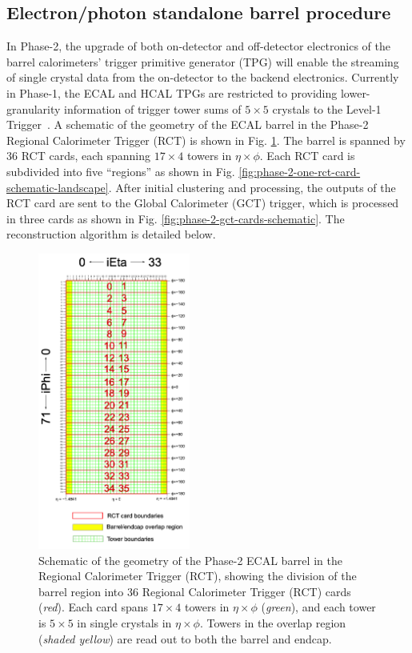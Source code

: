 \subsection{Electron/photon standalone barrel procedure}
In Phase-2, the upgrade of both on-detector and off-detector electronics of the barrel calorimeters' trigger primitive generator (TPG) will enable the streaming of single crystal data from the on-detector to the backend electronics. Currently in Phase-1, the ECAL and HCAL TPGs are restricted to providing lower-granularity information of trigger tower sums of $5 \times 5$ crystals to the Level-1 Trigger~\cite{CMS-TDR-021}. A schematic of the geometry of the ECAL barrel in the Phase-2 Regional Calorimeter Trigger (RCT) is shown in Fig. \ref{fig:phase-2-rct-cards-schematic}. The barrel is spanned by 36 RCT cards, each spanning $17 \times 4$ towers in $\eta \times \phi$. Each RCT card is subdivided into five ``regions'' as shown in Fig. \ref{fig:phase-2-one-rct-card-schematic-landscape}.  After initial clustering and processing, the outputs of the RCT card are sent to the Global Calorimeter (GCT) trigger, which is processed in three cards as shown in Fig. \ref{fig:phase-2-gct-cards-schematic}. The reconstruction algorithm is detailed below.
\begin{figure}[!ht]
    \centering
    \includegraphics[width=5cm]{figures/ch-3-phase2/phase-2-rct-cards-schematic.png}
    \caption{Schematic of the geometry of the Phase-2 ECAL barrel in the Regional Calorimeter Trigger (RCT), showing the division of the barrel region into 36 Regional Calorimeter Trigger (RCT) cards (\textit{red}). Each card spans $17 \times 4$ towers in $\eta \times \phi$ (\textit{green}), and each tower is $5\times 5$ in single crystals in $\eta \times \phi$. Towers in the overlap region (\textit{shaded yellow}) are read out to both the barrel and endcap.}
    \label{fig:phase-2-rct-cards-schematic}
\end{figure}


